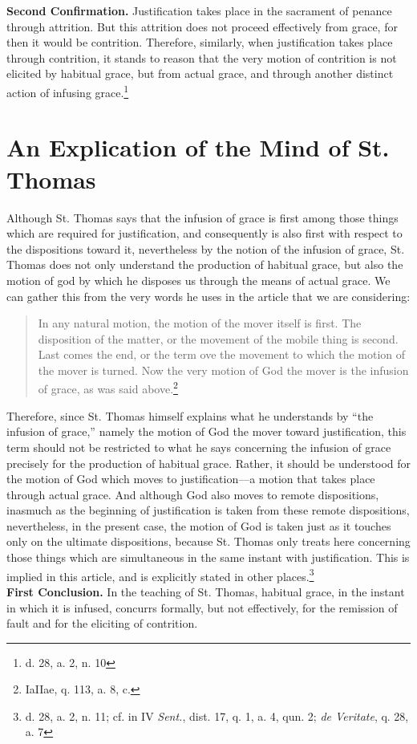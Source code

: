 \documentclass[11pt]{memoir}
\begin{document}
    \noindent \textbf{Second Confirmation.} Justification takes place in the sacrament of penance through
    attrition. But this attrition does not proceed effectively from grace, for then it would be contrition. Therefore,
    similarly, when justification takes place through contrition, it stands to reason that the very motion of contrition
    is not elicited by habitual grace, but from actual grace, and through another distinct action of infusing
    grace.\footnote{d. 28, a. 2, n. 10}

\section*{An Explication of the Mind of St. Thomas}

    Although St. Thomas says that the infusion of grace is first among those things which are required for
    justification, and consequently is also first with respect to the dispositions toward it, nevertheless by the notion
    of the infusion of grace, St. Thomas does not only understand the production of habitual grace, but also the motion
    of god by which he disposes us through the means of actual grace. We can gather this from the very words he uses in
    the article that we are considering:
    
    \begin{quote}
        In any natural motion, the motion of the mover itself is first. The disposition of the matter, or the movement
        of the mobile thing is second. Last comes the end, or the term ove the movement to which the motion of the mover
        is turned. Now the very motion of God the mover is the infusion of grace, as was said 
        above.\footnote{IaIIae, q. 113, a. 8, c.}
    \end{quote}

    \noindent Therefore, since St. Thomas himself explains what he understands by ``the infusion of grace,'' namely the motion of
    God the mover toward justification, this term should not be restricted to what he says concerning the infusion of
    grace precisely for the production of habitual grace. Rather, it should be understood for the motion of God which
    moves to justification---a motion that takes place through actual grace. And although God also moves to remote
    dispositions, inasmuch as the beginning of justification is taken from these remote dispositions, nevertheless, in
    the present case, the motion of God is taken just as it touches only on the ultimate dispositions, because St.
    Thomas only treats here concerning those things which are simultaneous in the same instant with justification. This
    is implied in this article, and is explicitly stated in other places.\footnote{d. 28, a. 2, n. 11; cf. in IV
        \emph{Sent.}, dist. 17, q. 1, a. 4, qun. 2; \emph{de Veritate}, q. 28, a. 7} \\

    \noindent \textbf{First Conclusion.} In the teaching of St. Thomas, habitual grace, in the instant in which it is
    infused, concurrs formally, but not effectively, for the remission of fault and for the eliciting of contrition.

    
    
\end{document}
